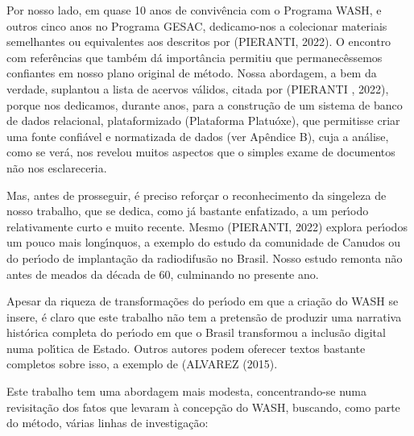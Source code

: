 \documentclass[
12pt,		%
openright,	%
twoside,  %
a4paper,			%
chapter=TITLE,		%
english,			%
french,				%
spanish,			%
brazil				%
]{USPSC-classe/USPSC}
\begin{document}
Por nosso lado, em quase 10 anos de conviv\^encia com o Programa WASH, e outros cinco anos no Programa GESAC, dedicamo-nos a colecionar materiais semelhantes ou equivalentes aos descritos por (PIERANTI, 2022). O encontro com refer\^encias que tamb\'em d\'a import\^ancia permitiu que permanec\^essemos confiantes em nosso plano original de m\'etodo. Nossa abordagem, a bem da verdade, suplantou a lista de acervos v\'alidos, citada por (PIERANTI , 2022), porque nos dedicamos, durante anos, para a constru\c{c}\~ao de um sistema de banco de dados relacional, plataformizado (Plataforma Platu\'oxe), que permitisse criar uma fonte confi\'avel e normatizada de dados (ver Ap\^endice B), cuja a an\'alise, como se ver\'a, nos revelou muitos aspectos que o simples exame de documentos n\~ao nos esclareceria.









Mas, antes de prosseguir, \'e preciso refor\c{c}ar o reconhecimento da singeleza de nosso trabalho, que se dedica, como j\'a bastante enfatizado, a um per\'{\i}odo relativamente curto e muito recente. Mesmo (PIERANTI, 2022) explora per\'{\i}odos um pouco mais long\'{\i}nquos, a exemplo do estudo da comunidade de Canudos ou do per\'{\i}odo de implanta\c{c}\~ao da radiodifus\~ao no Brasil. Nosso estudo remonta n\~ao antes de meados da d\'ecada de 60, culminando no presente ano.









Apesar da riqueza de transforma\c{c}\~oes do per\'{\i}odo em que a cria\c{c}\~ao do WASH se insere, \'e claro que este trabalho n\~ao tem a pretens\~ao de produzir uma narrativa hist\'orica completa do per\'{\i}odo em que o Brasil transformou a inclus\~ao digital numa pol\'{\i}tica de Estado. Outros autores podem oferecer textos bastante completos sobre isso, a exemplo de  (ALVAREZ (2015).









Este trabalho tem uma abordagem mais modesta, concentrando-se numa revisita\c{c}\~ao dos fatos que levaram \`a concep\c{c}\~ao do WASH, buscando, como parte do m\'etodo, v\'arias linhas de investiga\c{c}\~ao:
\end{document}
